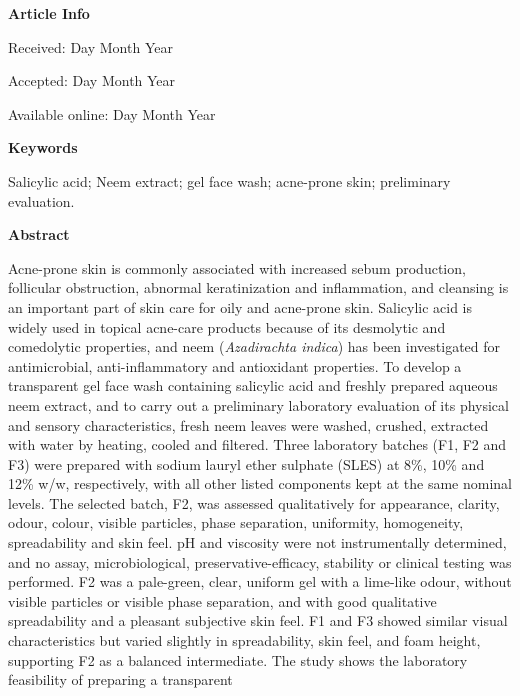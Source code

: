 \documentclass[10pt,a4paper,twocolumn]{article}
\begin{document}
{  \noindent\begin{minipage}[t]{0.32\textwidth}
  {\color{Brown}\textbf{Article Info}}\par\vspace{0.2cm}
  Received: Day Month Year\par
  Accepted: Day Month Year\par
  Available online: Day Month Year\par
  \vspace{1cm}
  {\color{Brown}\textbf{Keywords}}\par\vspace{0.2cm}
  Salicylic acid;
Neem extract; gel face wash; acne-prone skin; 
preliminary evaluation.
  \end{minipage}%
  \hfill
  \begin{minipage}[t]{0.64\textwidth}
  {\color{Brown}\textbf{Abstract}}\par\vspace{0.2cm}
  Acne-prone skin is commonly associated with increased sebum production,
follicular obstruction, abnormal keratinization and inflammation, and
cleansing is an important part of skin care for oily and acne-prone skin.
Salicylic acid is widely used in topical acne-care products because of
its desmolytic and comedolytic properties, and neem
(\textit{Azadirachta indica}) has been investigated for antimicrobial,
anti-inflammatory and antioxidant properties. To develop a transparent gel face wash containing salicylic acid and
freshly prepared aqueous neem extract, and to carry out a preliminary
laboratory evaluation of its physical and sensory characteristics, fresh neem leaves were washed, crushed, extracted with water by heating,
cooled and filtered. Three laboratory batches (F1, F2 and F3) were
prepared with sodium lauryl ether sulphate (SLES) at 8\%, 10\% and 12\%
w/w, respectively, with all other listed components kept at the same
nominal levels. The selected batch, F2, was assessed qualitatively for
appearance, clarity, odour, colour, visible particles, phase separation,
uniformity, homogeneity, spreadability and skin feel. pH and viscosity
were not instrumentally determined, and no assay, microbiological,
preservative-efficacy, stability or clinical testing was performed. F2 was a pale-green, clear, uniform gel with a lime-like odour, without
visible particles or visible phase separation, and with good qualitative
spreadability and a pleasant subjective skin feel. F1 and F3 showed
similar visual characteristics but varied slightly in spreadability, 
skin feel, and foam height, supporting F2 as a balanced intermediate. The study shows the laboratory feasibility of preparing a transparent

\end{minipage}}
\end{document}
